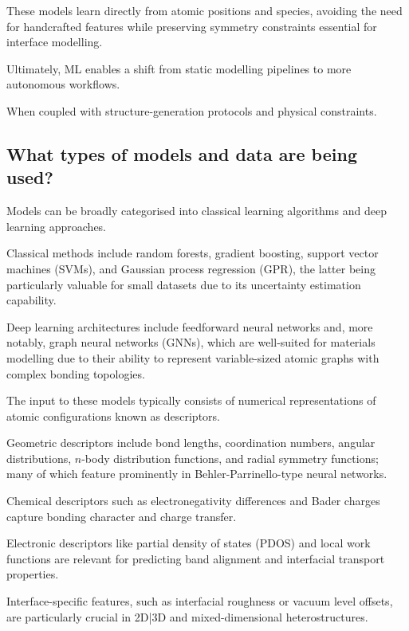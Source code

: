 These models learn directly from atomic positions and species, avoiding the need for handcrafted features while
preserving symmetry constraints essential for interface modelling.


Ultimately, ML enables a shift from static modelling pipelines to more autonomous workflows.

When coupled with structure-generation protocols and physical constraints.


\subsection{What types of models and data are being used?}


Models can be broadly categorised into classical learning algorithms and deep learning approaches.

Classical methods include random forests, gradient boosting, support vector machines (SVMs), and Gaussian process
regression (GPR), the latter being particularly valuable for small datasets due to its uncertainty estimation
capability.

Deep learning architectures include feedforward neural networks and, more notably, graph neural networks (GNNs), which
are well-suited for materials modelling due to their ability to represent variable-sized atomic graphs with complex
bonding topologies.


The input to these models typically consists of numerical representations of atomic configurations known as descriptors.

Geometric descriptors include bond lengths, coordination numbers, angular distributions, $n$-body distribution
functions, and radial symmetry functions; many of which feature prominently in Behler-Parrinello-type neural networks.

Chemical descriptors such as electronegativity differences and Bader charges capture bonding character and charge
transfer.

Electronic descriptors like partial density of states (PDOS) and local work functions are relevant for predicting band
alignment and interfacial transport properties.

Interface-specific features, such as interfacial roughness or vacuum level offsets, are particularly crucial in 2D|3D
and mixed-dimensional heterostructures.

